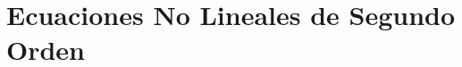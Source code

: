 \section{Ecuaciones No Lineales de Segundo Orden}


























































